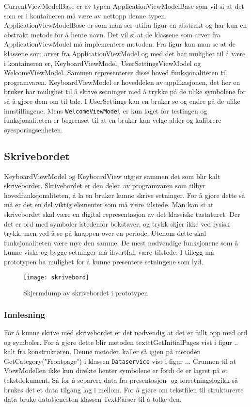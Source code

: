{CurrentViewModelBase er av typen ApplicationViewModelBase som vil si at det som er i kontaineren må være av nettopp denne typen. ApplicationViewModelBase er som man ser utifra figur  en abstrakt og har kun en abstrakt metode for å hente navn.  Det vil si at de klassene som arver fra ApplicationViewModel må implementere metoden. Fra figur kan man se at de klassene som arver fra ApplicationViewModel og med det har mulighet til å være i kontaineren er, KeyboardViewModel, UserSettingsViewModel og WelcomeViewModel. Sammen representerer disse hoved funksjonaliteten til programvaren. KeyboardViewModel er hoveddelen av applikasjonen, det her en bruker har mulighet til å skrive setninger med å trykke på de ulike symbolene for så å gjøre dem om til tale. I UserSettings kan en bruker se og endre på de ulike innstillingene. Mens \texttt{WelcomeViewModel} er kun laget for testingen og funksjonaliteten er begrenset til at en bruker kan velge alder og kalibrere øyesporingsenheten. 
 
 
 \subsection{Skrivebordet}
 
KeyboardViewModel og KeyboardView utgjør sammen det som blir kalt skrivebordet. Skrivebordet er den delen av programvaren som tilbyr hovedfunksjonaliteten, å la en bruker kunne skrive setninger. For å gjøre dette så må er det en del viktig elementer som må være tilstede. Man kan si at skrivebordet skal være en digital representasjon av det klassiske tastaturet. Der det er ord med symboler istedenfor bokstaver, og trykk skjer ikke ved fysisk trykk, men ved å se på knappen over en periode. Utenom dette skal funksjonaliteten være mye den samme. De mest nødvendige funksjonene som å kunne viske og bygge setninger må ihvertfall være tilstede. I tillegg må prototypen ha mulighet for å kunne presentere setningene som lyd. 

\begin{figure}[ht!] 
\centering 
\texttt{[image: skrivebord]} 
\caption{Skjermdump av skrivebordet i prototypen} 
\label{fig:skrivebord} 
\end{figure} 
 

\subsubsection{Innlesning}


For å kunne skrive med skrivebordet er det nødvendig at det er fullt opp med ord og symboler. For å gjøre dette blir metoden texttt{GetInitialPages} vist i figur .. kalt fra konstruktøren. Denne metoden kaller så igjen på metoden GetCategory("Frontpage") i klassen \texttt{Dataservice} vist i figur ... Grunnen til at ViewModellen ikke kun direkte henter symbolene er fordi de er lagret på et tekstdokument. Så for å separere data fra presentasjon- og forretningslogikk så brukes det et data tilgang lag i mellom. For å gjøre om tekstfilen til strukturerte data bruke datatjenesten klassen TextParser til å tolke den. 


}

